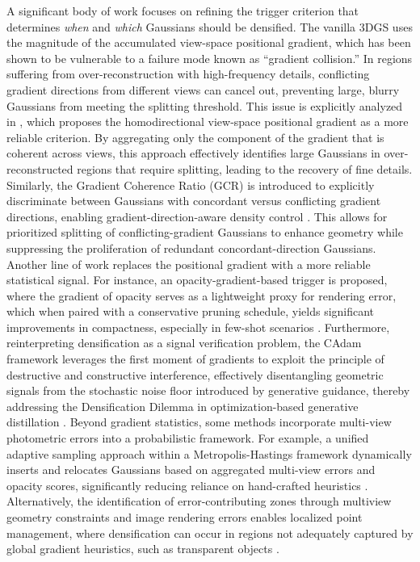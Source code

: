 \documentclass[11pt]{article}
\begin{document}
A significant body of work focuses on refining the trigger criterion that determines \emph{when} and \emph{which} Gaussians should be densified. The vanilla 3DGS uses the magnitude of the accumulated view-space positional gradient, which has been shown to be vulnerable to a failure mode known as ``gradient collision.'' In regions suffering from over-reconstruction with high-frequency details, conflicting gradient directions from different views can cancel out, preventing large, blurry Gaussians from meeting the splitting threshold. This issue is explicitly analyzed in \cite{ref118}, which proposes the homodirectional view-space positional gradient as a more reliable criterion. By aggregating only the component of the gradient that is coherent across views, this approach effectively identifies large Gaussians in over-reconstructed regions that require splitting, leading to the recovery of fine details. Similarly, the Gradient Coherence Ratio (GCR) is introduced to explicitly discriminate between Gaussians with concordant versus conflicting gradient directions, enabling gradient-direction-aware density control \cite{ref119}. This allows for prioritized splitting of conflicting-gradient Gaussians to enhance geometry while suppressing the proliferation of redundant concordant-direction Gaussians. Another line of work replaces the positional gradient with a more reliable statistical signal. For instance, an opacity-gradient-based trigger is proposed, where the gradient of opacity serves as a lightweight proxy for rendering error, which when paired with a conservative pruning schedule, yields significant improvements in compactness, especially in few-shot scenarios \cite{ref120}. Furthermore, reinterpreting densification as a signal verification problem, the CAdam framework leverages the first moment of gradients to exploit the principle of destructive and constructive interference, effectively disentangling geometric signals from the stochastic noise floor introduced by generative guidance, thereby addressing the Densification Dilemma in optimization-based generative distillation \cite{ref121}. Beyond gradient statistics, some methods incorporate multi-view photometric errors into a probabilistic framework. For example, a unified adaptive sampling approach within a Metropolis-Hastings framework dynamically inserts and relocates Gaussians based on aggregated multi-view errors and opacity scores, significantly reducing reliance on hand-crafted heuristics \cite{ref122}. Alternatively, the identification of error-contributing zones through multiview geometry constraints and image rendering errors enables localized point management, where densification can occur in regions not adequately captured by global gradient heuristics, such as transparent objects \cite{ref123}.
\end{document}
